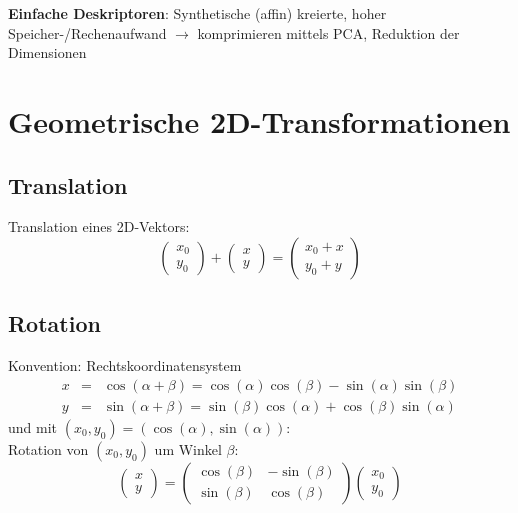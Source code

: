 \textbf{Einfache Deskriptoren}: Synthetische (affin) kreierte, hoher Speicher-/Rechenaufwand $\to$ komprimieren mittels PCA, Reduktion der Dimensionen

\section{Geometrische 2D-Transformationen}

\subsection{Translation}

Translation eines 2D-Vektors: $$\left( \begin{array}{c} x_0 \\ y_0 \end{array} \right) + \left( \begin{array}{c} x \\ y \end{array} \right) = \left( \begin{array}{c} x_0 + x \\ y_0 + y \end{array} \right)$$

\subsection{Rotation}

Konvention: Rechtskoordinatensystem
\begin{eqnarray*}
x &=& \cos(\alpha + \beta) = \cos(\alpha) \cos(\beta) - \sin(\alpha) \sin(\beta) \\ y &=& \sin(\alpha + \beta) = \sin(\beta) \cos(\alpha) + \cos(\beta) \sin(\alpha)
\end{eqnarray*}
und mit $(x_0,y_0) = (\cos(\alpha), \sin(\alpha))$: \\
Rotation von $(x_0,y_0)$ um Winkel $\beta$:
$$\left( \begin{array}{c} x \\ y \end{array} \right) = \left( \begin{array}{rr} \cos(\beta) & -\sin(\beta) \\ \sin(\beta) & \cos(\beta) \end{array} \right) \left( \begin{array}{c} x_0 \\ y_0 \end{array} \right)$$

